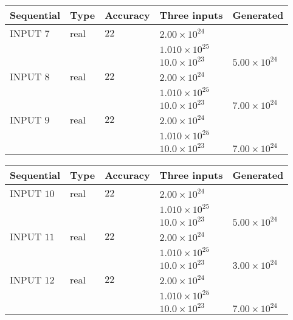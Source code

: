 \documentclass[12pt]{article}
\begin{document}
   
  
  
\noindent\begin{tabular}{|l|l|l|l|l|}
\hline
 Sequential & Type & Accuracy & Three inputs & Generated \\ 
\hline
 
 
  INPUT $           7$ & real & $          22 $ & $
 2.00 \times 10^{24}
  $ & \\
  & & &  $
 1.010 \times 10^{25}
  $ & \\
  & & &  $
 10.0 \times 10^{23}
 $ & $ 5.00 \times 10^{24} $ 
 \\  \hline  
 
 
  INPUT $           8$ & real & $          22 $ & $
 2.00 \times 10^{24}
  $ & \\
  & & &  $
 1.010 \times 10^{25}
  $ & \\
  & & &  $
 10.0 \times 10^{23}
 $ & $ 7.00 \times 10^{24} $ 
 \\  \hline  
 
 
  INPUT $           9$ & real & $          22 $ & $
 2.00 \times 10^{24}
  $ & \\
  & & &  $
 1.010 \times 10^{25}
  $ & \\
  & & &  $
 10.0 \times 10^{23}
 $ & $ 7.00 \times 10^{24} $ 
 \\  \hline  
 \end{tabular}
   
   
  
  
\noindent\begin{tabular}{|l|l|l|l|l|}
\hline
 Sequential & Type & Accuracy & Three inputs & Generated \\ 
\hline
 
 
  INPUT $          10$ & real & $          22 $ & $
 2.00 \times 10^{24}
  $ & \\
  & & &  $
 1.010 \times 10^{25}
  $ & \\
  & & &  $
 10.0 \times 10^{23}
 $ & $ 5.00 \times 10^{24} $ 
 \\  \hline  
 
 
  INPUT $          11$ & real & $          22 $ & $
 2.00 \times 10^{24}
  $ & \\
  & & &  $
 1.010 \times 10^{25}
  $ & \\
  & & &  $
 10.0 \times 10^{23}
 $ & $ 3.00 \times 10^{24} $ 
 \\  \hline  
 
 
  INPUT $          12$ & real & $          22 $ & $
 2.00 \times 10^{24}
  $ & \\
  & & &  $
 1.010 \times 10^{25}
  $ & \\
  & & &  $
 10.0 \times 10^{23}
 $ & $ 7.00 \times 10^{24} $ 
 \\  \hline  
 \end{tabular}
   
\end{document}
